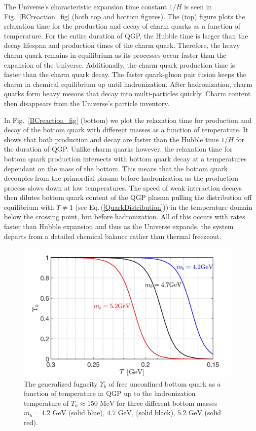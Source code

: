 \documentclass[universe,article,submit,moreauthors,pdftex,a4paper]{Definitions/mdpi}
\newcommand{\GeV}{\text{ GeV}}
\newcommand{\MeV}{\text{ MeV}}
\newcommand{\req}[1]{Eq.\,(\ref{#1})}
\newcommand*{\rf}[1]{Fig.~{\ref{#1}}}
\begin{document}
The Universe's characteristic expansion time constant $1/H$ is seen in \rf{BCreaction_fig} (both top and bottom figures). The (top) figure plots the relaxation time for the production and decay of charm quarks as a function of temperature. For the entire duration of QGP, the Hubble time is larger than the decay lifespan and production times of the charm quark. Therefore, the heavy charm quark remains in equilibrium as its processes occur faster than the expansion of the Universe. Additionally, the charm quark production time is faster than the charm quark decay. The faster quark-gluon pair fusion keeps the charm in chemical equilibrium up until hadronization. After hadronization, charm quarks form heavy mesons that decay into multi-particles quickly. Charm content then disappears from the Universe's particle inventory.

In \rf{BCreaction_fig} (bottom) we plot the relaxation time for production and decay of the bottom quark with different masses as a function of temperature. It shows that both production and decay are faster than the Hubble time $1/H$ for the duration of QGP. Unlike charm quarks however, the relaxation time for bottom quark production intersects with bottom quark decay at a temperatures dependant on the mass of the bottom. This means that the bottom quark decouples from the primordial plasma before hadronization as the production process slows down at low temperatures. The speed of weak interaction decays then dilutes bottom quark content of the QGP plasma pulling the distribution off equilibrium with $\Upsilon\neq1$ (see \req{QuarkDistribution}) in the temperature domain below the crossing point, but before hadronization. All of this occurs with rates faster than Hubble expansion and thus as the Universe expands, the system departs from a detailed chemical balance rather than thermal freezeout.

\begin{figure}[t]
\centering
\includegraphics[width=\textwidth]{./plots/BquarkFugacity.jpg}
    \caption{The generalized fugacity $\Upsilon_{b}$ of free unconfined bottom quark as a function of temperature in QGP up to the hadronization temperature of $T_{h}\approx150\MeV$ for three different bottom masses $m_{b}=4.2\GeV$ (solid blue), $4.7\GeV$, (solid black), $5.2\GeV$ (solid red).}
\label{UpsilonBottom_fig}
\end{figure}
\end{document}
